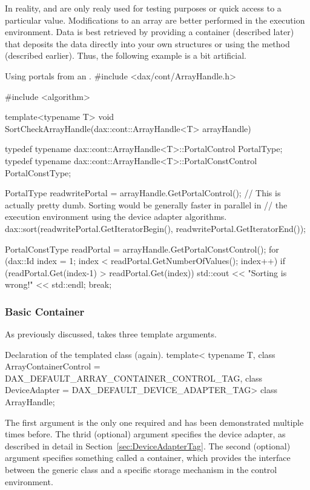 In reality,  and
 are only realy used for testing purposes
or quick access to a particular value. Modifications to an array are better
performed in the execution environment. Data is best retrieved by providing
a container (described later) that deposits the data directly into your own
structures or using the  method (described
earlier). Thus, the following example is a bit artificial.

\begin{daxexample}{Using portals from an .}
#include <dax/cont/ArrayHandle.h>

#include <algorithm>

template<typename T>
void SortCheckArrayHandle(dax::cont::ArrayHandle<T> arrayHandle)
{
  typedef typename dax::cont::ArrayHandle<T>::PortalControl PortalType;
  typedef typename dax::cont::ArrayHandle<T>::PortalConstControl PortalConstType;

  PortalType readwritePortal = arrayHandle.GetPortalControl();
  // This is actually pretty dumb. Sorting would be generally faster in parallel in
  // the execution environment using the device adapter algorithms.
  dax::sort(readwritePortal.GetIteratorBegin(), readwritePortal.GetIteratorEnd());

  PortalConstType readPortal = arrayHandle.GetPortalConstControl();
  for (dax::Id index = 1; index < readPortal.GetNumberOfValues(); index++)
    {
    if (readPortal.Get(index-1) > readPortal.Get(index))
      {
      std::cout << "Sorting is wrong!" << std::endl;
      break;
      }
    }
}
\end{daxexample}


\subsubsection{Basic Container}


As previously discussed,  takes three template
arguments.
\begin{daxexample}{Declaration of the \protect{} templated class (again).}
template<
    typename T,
    class ArrayContainerControl = DAX_DEFAULT_ARRAY_CONTAINER_CONTROL_TAG,
    class DeviceAdapter = DAX_DEFAULT_DEVICE_ADAPTER_TAG>
class ArrayHandle;
\end{daxexample}
The first argument is the only one required and has been demonstrated
multiple times before. The thrid (optional) argument specifies the device
adapter, as described in detail in Section~\ref{sec:DeviceAdapterTag}. The
second (optional) argument specifies something called a container, which
provides the interface between the generic  class and
a specific storage mechanism in the control environment.

